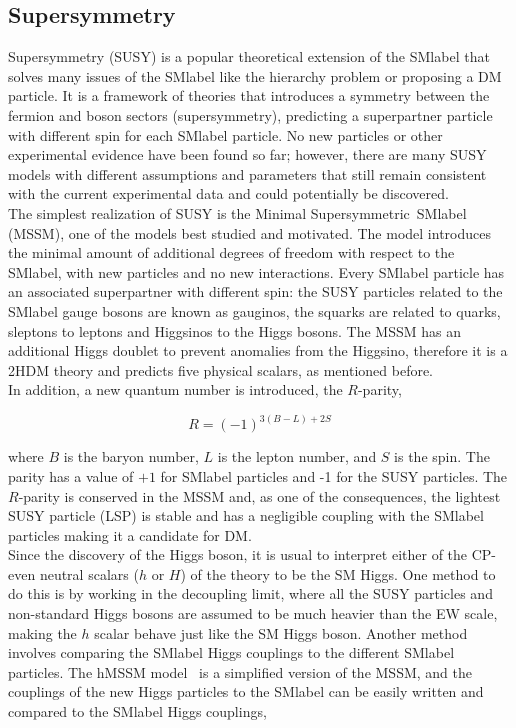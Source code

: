 \subsection{Supersymmetry}

Supersymmetry (SUSY) is a popular theoretical extension of the \acrshort{SMlabel} that solves many issues of the \acrshort{SMlabel} like the hierarchy problem or proposing a DM particle. It is a framework of theories that introduces a symmetry between the fermion and boson sectors (supersymmetry), predicting a superpartner particle with different spin for each \acrshort{SMlabel} particle. No new particles or other experimental evidence have been found so far; however, there are many SUSY models with different assumptions and parameters that still remain consistent with the current experimental data and could potentially be discovered.\\

The simplest realization of SUSY is the Minimal Supersymmetric~\acrshort{SMlabel} (MSSM), one of the models best studied and motivated. The model introduces the minimal amount of additional degrees of freedom with respect to the \acrshort{SMlabel}, with new particles and no new interactions. Every \acrshort{SMlabel} particle has an associated superpartner with different spin: the SUSY particles related to the \acrshort{SMlabel} gauge bosons are known as gauginos, the squarks are related to quarks, sleptons to leptons and Higgsinos to the Higgs bosons. The MSSM has an additional Higgs doublet to prevent anomalies from the Higgsino, therefore it is a 2HDM theory and predicts five physical scalars, as mentioned before.\\

In addition, a new quantum number is introduced, the $R$-parity,

\begin{equation}
    R=(-1)^{3(B-L)+2S}
\end{equation}

where $B$ is the baryon number, $L$ is the lepton number, and $S$ is the spin. The parity has a value of $+1$ for \acrshort{SMlabel} particles and -1 for the SUSY particles. The $R$-parity is conserved in the MSSM and, as one of the consequences, the lightest SUSY particle (LSP) is stable and has a negligible coupling with the \acrshort{SMlabel} particles making it a candidate for DM.\\

Since the discovery of the Higgs boson, it is usual to interpret either of the CP-even neutral scalars ($h$ or $H$) of the theory to be the SM Higgs. One method to do this is by working in the decoupling limit, where all the SUSY particles and non-standard Higgs bosons are assumed to be much heavier than the \acrshort{EW} scale, making the $h$ scalar behave just like the SM Higgs boson. Another method involves comparing the \acrshort{SMlabel} Higgs couplings to the different \acrshort{SMlabel} particles. The hMSSM model~\cite{arxiv.1502.05653} is a simplified version of the MSSM, and the couplings of the new Higgs particles to the \acrshort{SMlabel} can be easily written and compared to the \acrshort{SMlabel} Higgs couplings,


